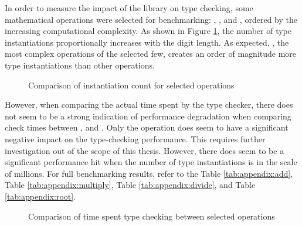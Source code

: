 In order to measure the impact of the library on type checking, some mathematical operations were selected for benchmarking: , ,  and , ordered by the increasing computational complexity. As shown in Figure \ref{fig:instantiation-count}, the number of type instantiations proportionally increases with the digit length. As expected, , the most complex operations of the selected few, creates an order of magnitude more type instantiations than other operations.

\begin{figure}[ht]
  \centering
  \resizebox{\textwidth}{!}{}
  \caption{Comparison of instantiation count for selected operations}
  \label{fig:instantiation-count}
\end{figure}

However, when comparing the actual time spent by the type checker, there does not seem to be a strong indication of performance degradation when comparing check times between ,  and . Only the  operation does seem to have a significant negative impact on the type-checking performance. This requires further investigation out of the scope of this thesis. However, there does seem to be a significant performance hit when the number of type instantiations is in the scale of millions. For full benchmarking results, refer to the Table \ref{tab:appendix:add}, Table \ref{tab:appendix:multiply}, Table \ref{tab:appendix:divide}, and Table \ref{tab:appendix:root}.

\begin{figure}[ht]
  \centering
  \resizebox{\textwidth}{!}{}
  \caption{Comparison of time spent type checking between selected operations}
  \label{fig:check-time}
\end{figure}

